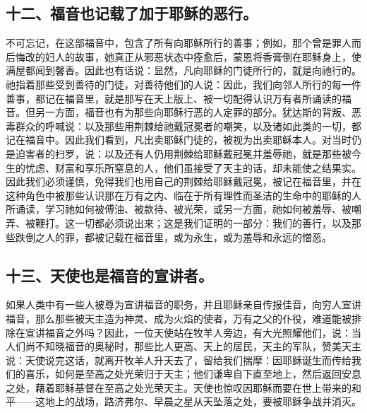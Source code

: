 
\subsection{十二、福音也记载了加于耶稣的恶行。}

不可忘记，在这部福音中，包含了所有向耶稣所行的善事；例如，那个曾是罪人而后悔改的妇人的故事，她真正从邪恶状态中痊愈后，蒙恩将香膏倒在耶稣身上，使满屋都闻到馨香。因此也有话说：显然，凡向耶稣的门徒所行的，就是向祂行的。祂指着那些受到善待的门徒，对善待他们的人说：因此，我们向邻人所行的每一件善事，都记在福音里，就是那写在天上版上、被一切配得认识万有者所诵读的福音。但另一方面，福音也有为那些向耶稣行恶的人定罪的部分。犹达斯的背叛、恶毒群众的呼喊说：以及那些用荆棘给祂戴冠冕者的嘲笑，以及诸如此类的一切，都记在福音中。因此我们看到，凡出卖耶稣门徒的，被视为出卖耶稣本人。对当时仍是迫害者的扫罗，说：以及还有人仍用荆棘给耶稣戴冠冕并羞辱祂，就是那些被今生的忧虑、财富和享乐所窒息的人，他们虽接受了天主的话，却未能使之结果实。因此我们必须谨慎，免得我们也用自己的荆棘给耶稣戴冠冕，被记在福音里，并在这种角色中被那些认识那在万有之内、临在于所有理性而圣洁的生命中的耶稣的人所诵读，学习祂如何被傅油、被款待、被光荣，或另一方面，祂如何被羞辱、被嘲弄、被鞭打。这一切都必须说出来；这是我们证明的一部分：我们的善行，以及那些跌倒之人的罪，都被记载在福音里，或为永生，或为羞辱和永远的憎恶。\par


\subsection{十三、天使也是福音的宣讲者。}

如果人类中有一些人被尊为宣讲福音的职务，并且耶稣亲自传报佳音，向穷人宣讲福音，那么那些被天主造为神灵、成为火焰的使者，万有之父的仆役，难道能被排除在宣讲福音之外吗？因此，一位天使站在牧羊人旁边，有大光照耀他们，说：当人们尚不知晓福音的奥秘时，那些比人更高、天上的居民，天主的军队，赞美天主说：天使说完这话，就离开牧羊人升天去了，留给我们揣摩：因耶稣诞生而传给我们的喜乐，如何是至高之处光荣归于天主；他们谦卑自下直至地上，然后返回安息之处，藉着耶稣基督在至高之处光荣天主。天使也惊叹因耶稣而要在世上带来的和平——这地上的战场，路济弗尔、早晨之星从天坠落之处，要被耶稣争战并消灭。\par

